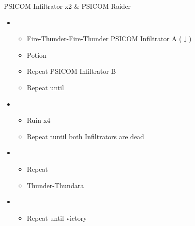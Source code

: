 \begin{battle}{PSICOM Infiltrator x2 \& PSICOM Raider}
\begin{multicols}{2}
\begin{itemize}
    \item \fourth
    \begin{itemize}
        \item Fire-Thunder-Fire-Thunder PSICOM Infiltrator A ($\downarrow$)
        \item Potion
        \item Repeat PSICOM Infiltrator B
        \item Repeat until \stagger
    \end{itemize}
    \columnbreak
    \item \fifth
    \begin{itemize}
        \item Ruin x4
        \item Repeat tuntil both Infiltrators are dead
    \end{itemize}
    \item \fourth
    \begin{itemize}
        \item Repeat
        \item Thunder-Thundara
        \stagger
    \end{itemize}
    \item \fifth
    \begin{itemize}
        \item Repeat until victory
    \end{itemize}
\end{itemize}
\end{multicols}
 
\end{battle}

